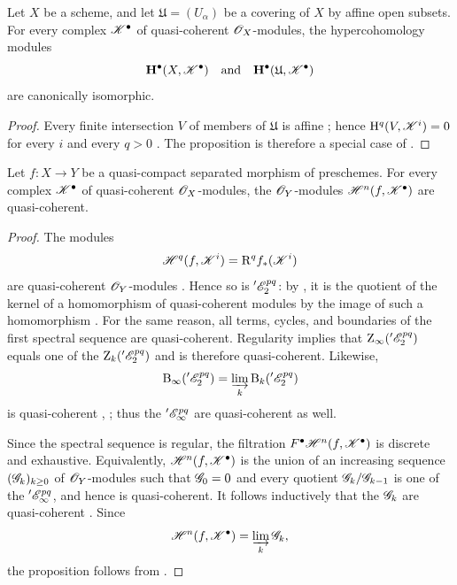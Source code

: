\begin{proposition}[6.2.2]
\label{III.6.2.2}
Let $X$ be a scheme, and let $\mathfrak{U}=(U_\alpha)$ be a
covering of $X$ by affine open subsets.  For every complex
$\mathscr{K}^\bullet$ of quasi-coherent $\mathscr{O}_X$-modules, the
hypercohomology modules
\[
  \mathbf{H}^\bullet(X,\mathscr{K}^\bullet)
  \quad\text{and}\quad
  \mathbf{H}^\bullet(\mathfrak{U},\mathscr{K}^\bullet)
\]
are canonically isomorphic.
\end{proposition}

\begin{proof}
Every finite intersection $V$ of members of $\mathfrak{U}$ is
affine ; hence
$\mathrm{H}^q(V,\mathscr{K}^i)=0$ for every $i$ and every $q>0$
.  The proposition is therefore a special case of
.
\end{proof}

\begin{proposition}[6.2.3]
\label{III.6.2.3}
Let $f:X\to Y$ be a quasi-compact separated morphism of
preschemes.  For every complex $\mathscr{K}^\bullet$ of quasi-coherent
$\mathscr{O}_X$-modules, the $\mathscr{O}_Y$-modules
$\mathscr{H}^n(f,\mathscr{K}^\bullet)$ are quasi-coherent.
\end{proposition}

\begin{proof}
The modules
\[
  \mathscr{H}^q(f,\mathscr{K}^i)=\mathrm{R}^qf_*(\mathscr{K}^i)
\]
are quasi-coherent $\mathscr{O}_Y$-modules .  Hence so
is $'\mathscr{E}_2^{pq}$: by , it is the quotient of
the kernel of a homomorphism of quasi-coherent modules by the image
of such a homomorphism .  For the same reason, all
terms, cycles, and boundaries of the first spectral sequence are
quasi-coherent.  Regularity implies that
$\mathrm{Z}_\infty('\mathscr{E}_2^{pq})$ equals one of the
$\mathrm{Z}_k('\mathscr{E}_2^{pq})$ and is therefore quasi-coherent.
Likewise,
\[
  \mathrm{B}_\infty('\mathscr{E}_2^{pq})
  =
  \varinjlim_k\mathrm{B}_k('\mathscr{E}_2^{pq})
\]
is quasi-coherent , ; thus the
$'\mathscr{E}_\infty^{pq}$ are quasi-coherent as well.

Since the spectral sequence is regular, the filtration
$F^\bullet\mathscr{H}^n(f,\mathscr{K}^\bullet)$ is discrete and
exhaustive.  Equivalently,
$\mathscr{H}^n(f,\mathscr{K}^\bullet)$ is the union of an increasing
sequence $(\mathscr{G}_k)_{k\geq0}$ of $\mathscr{O}_Y$-modules such that
$\mathscr{G}_0=0$ and every quotient
$\mathscr{G}_k/\mathscr{G}_{k-1}$ is one of the
$'\mathscr{E}_\infty^{pq}$, and hence is quasi-coherent.  It follows
inductively that the $\mathscr{G}_k$ are quasi-coherent
.  Since
\[
  \mathscr{H}^n(f,\mathscr{K}^\bullet)
  =
  \varinjlim_k\mathscr{G}_k,
\]
the proposition follows from .
\end{proof}


